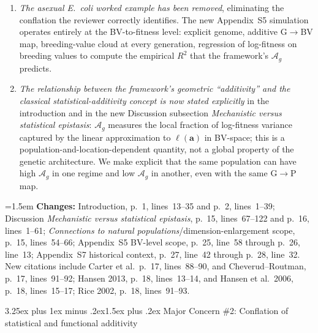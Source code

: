 \documentclass[11pt,a4paper]{article}
\makeatletter
\newcommand{\changesat}[1]{%
  \par\smallskip\noindent\hangindent=1.5em\hangafter=1
  \textbf{\color{ChangeColor}Changes:} \quad #1\par\medskip
}
\renewcommand{\subsection}{\@startsection{subsection}{2}{0pt}%
  {3.25ex plus 1ex minus .2ex}{1.5ex plus .2ex}%
  {\large\bfseries}}
\newcommand{\Ag}{\ensuremath{\mathcal{A}_{g}}\xspace}
\newcommand{\vect}[1]{\ensuremath{\bm{#1}}}
\makeatother
\begin{document}
\begin{enumerate}[leftmargin=*]
\item \textit{The asexual \textit{E.~coli} worked example has been removed}, eliminating the conflation the reviewer correctly identifies. The new Appendix~S5 simulation operates entirely at the BV-to-fitness level: explicit genome, additive G$\to$BV map, breeding-value cloud at every generation, regression of log-fitness on breeding values to compute the empirical $R^2$ that the framework's $\Ag$ predicts.

\item \textit{The relationship between the framework's geometric ``additivity'' and the classical statistical-additivity concept is now stated explicitly} in the introduction and in the new Discussion subsection \textit{Mechanistic versus statistical epistasis}: $\Ag$ measures the local fraction of log-fitness variance captured by the linear approximation to $\ell(\vect{a})$ in BV-space; this is a population-and-location-dependent quantity, not a global property of the genetic architecture. We make explicit that the same population can have high $\Ag$ in one regime and low $\Ag$ in another, even with the same G$\to$P map.

\end{enumerate}

\changesat{Introduction, p.~1, lines~13--35 and p.~2, lines~1--39; Discussion \textit{Mechanistic versus statistical epistasis}, p.~15, lines~67--122 and p.~16, lines~1--61; \textit{Connections to natural populations}/dimension-enlargement scope, p.~15, lines~54--66; Appendix~S5 BV-level scope, p.~25, line~58 through p.~26, line~13; Appendix~S7 historical context, p.~27, line~42 through p.~28, line~32. New citations include Carter et al.\ p.~17, lines~88--90, and Cheverud--Routman, p.~17, lines~91--92; Hansen 2013, p.~18, lines~13--14, and Hansen et al.\ 2006, p.~18, lines~15--17; Rice 2002, p.~18, lines~91--93.}

\subsection{Major Concern \#2: Conflation of statistical and functional additivity}
\end{document}
